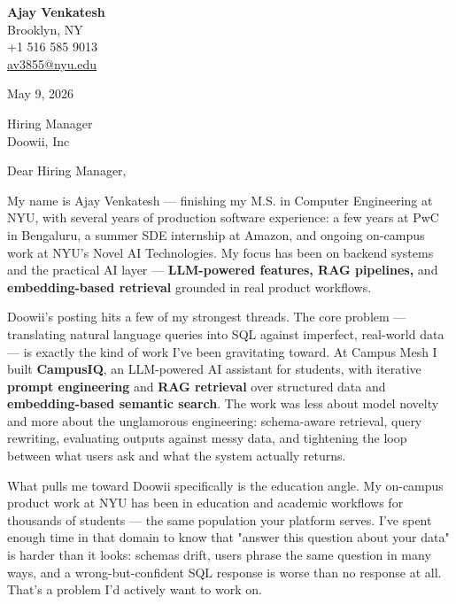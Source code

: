 \documentclass[letterpaper,11pt]{article}
\begin{document}
\begin{flushleft}
\textbf{\large Ajay Venkatesh} \\
Brooklyn, NY \\
+1 516 585 9013 \\
\href{mailto:av3855@nyu.edu}{av3855@nyu.edu}
\end{flushleft}

\vspace{10pt}

May 9, 2026

\vspace{6pt}

Hiring Manager \\
Doowii, Inc

\vspace{10pt}

Dear Hiring Manager,

My name is Ajay Venkatesh --- finishing my M.S. in Computer Engineering at NYU, with several years of production software experience: a few years at PwC in Bengaluru, a summer SDE internship at Amazon, and ongoing on-campus work at NYU's Novel AI Technologies. My focus has been on backend systems and the practical AI layer --- \textbf{LLM-powered features, RAG pipelines,} and \textbf{embedding-based retrieval} grounded in real product workflows.

Doowii's posting hits a few of my strongest threads. The core problem --- translating natural language queries into SQL against imperfect, real-world data --- is exactly the kind of work I've been gravitating toward. At Campus Mesh I built \textbf{CampusIQ}, an LLM-powered AI assistant for students, with iterative \textbf{prompt engineering} and \textbf{RAG retrieval} over structured data and \textbf{embedding-based semantic search}. The work was less about model novelty and more about the unglamorous engineering: schema-aware retrieval, query rewriting, evaluating outputs against messy data, and tightening the loop between what users ask and what the system actually returns.

What pulls me toward Doowii specifically is the education angle. My on-campus product work at NYU has been in education and academic workflows for thousands of students --- the same population your platform serves. I've spent enough time in that domain to know that "answer this question about your data" is harder than it looks: schemas drift, users phrase the same question in many ways, and a wrong-but-confident SQL response is worse than no response at all. That's a problem I'd actively want to work on.
\end{document}
